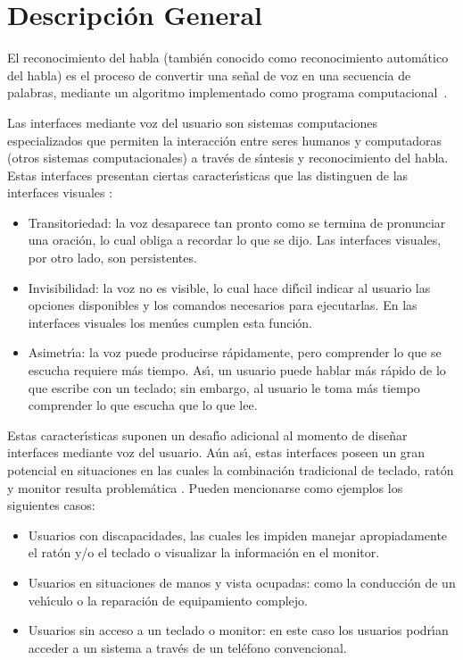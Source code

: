 \section{Descripci\'on General}
\label{sec:problema-general}

El reconocimiento del habla (tambi\'en conocido como reconocimiento autom\'atico del habla) es el proceso
de convertir una se\~nal de voz en una secuencia de palabras, mediante un algoritmo implementado
como programa \mbox{computacional \cite{JaisalAReview2012}}.

Las interfaces mediante voz del usuario son sistemas computaciones especializados que permiten la
interacci\'on entre seres humanos y computadoras (otros sistemas computacionales) a trav\'es de
s{\'\i}ntesis y reconocimiento del habla. Estas interfaces presentan ciertas caracter{\'\i}sticas que las
distinguen de las interfaces visuales \cite{GabrielVoice2007}:

\begin{itemize}
	\item Transitoriedad: la voz desaparece tan pronto como se termina de pronunciar una oraci\'on,
	lo cual obliga a recordar lo que se dijo. Las interfaces visuales, por otro lado, son persistentes.
	\item Invisibilidad: la voz no es visible, lo cual hace dif{\'\i}cil indicar al usuario las opciones
	disponibles y los comandos necesarios para ejecutarlas. En las interfaces visuales los men\'ues
	cumplen esta funci\'on.
	\item Asimetr{\'\i}a: la voz puede producirse r\'apidamente, pero comprender lo que se escucha requiere
	m\'as tiempo. As{\'\i}, un usuario puede hablar m\'as r\'apido de lo que escribe con un teclado; sin embargo,
	al usuario le toma m\'as tiempo comprender lo que escucha que lo que lee.
\end{itemize}

Estas caracter{\'\i}sticas suponen un desaf{\'\i}o adicional al momento de dise\~nar interfaces mediante voz del
usuario. A\'un as{\'\i}, estas interfaces poseen un gran potencial en situaciones en las cuales la
combinaci\'on tradicional de teclado, rat\'on y monitor resulta problem\'atica \cite{NielsenVoice2003}.
Pueden mencionarse como ejemplos los siguientes casos:

\begin{itemize}
	\item Usuarios con discapacidades, las cuales les impiden manejar apropiadamente el rat\'on y/o
	el teclado o visualizar la informaci\'on en el monitor.
	\item Usuarios en situaciones de manos y vista ocupadas: como la conducci\'on de un veh{\'\i}culo o
	la reparaci\'on de equipamiento complejo.
	\item Usuarios sin acceso a un teclado o monitor: en este caso los usuarios podr{\'\i}an acceder
	a un sistema a trav\'es de un tel\'efono convencional.
\end{itemize}

